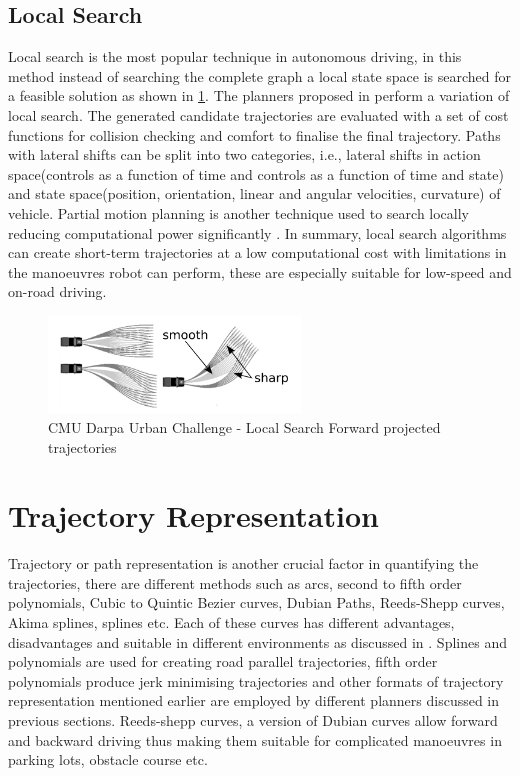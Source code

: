 \subsection{Local Search}
\label{rw_local_search}

Local search is the most popular technique in autonomous driving, in this method instead of searching the complete graph a local state space is searched for a feasible solution as shown in \ref{cmubossduc}. The planners proposed in \cite{darpa_urban_challenge} \cite{juniorstanford} \cite{kolski_thesis} \cite{Broggi2012} \cite{real_time_traj_plan_article} \cite{urbansafetyeth} perform a variation of local search. The generated candidate trajectories are evaluated with a set of cost functions for collision checking and comfort to finalise the final trajectory. Paths with lateral shifts can be split into two categories, i.e., lateral shifts in action space(controls as a function of time and controls as a function of time and state) and state space(position, orientation, linear and angular velocities, curvature) of vehicle\cite{howard_phd}. Partial motion planning is another technique used to search locally reducing computational power significantly \cite{partialmotionplanning}. In summary, local search algorithms can create short-term trajectories at a low computational cost with limitations in the manoeuvres robot can perform, these are especially suitable for low-speed and on-road driving.

\begin{figure}
	\centering
	\includegraphics[width=0.6\textwidth]{Images/related_work/trajectorysetbossduc.png}
	\caption{CMU Darpa Urban Challenge - Local Search Forward projected trajectories}
	\label{cmubossduc}
\end{figure} 

\section{Trajectory Representation}
\label{trajrep}
Trajectory or path representation is another crucial factor in quantifying the trajectories, there are different methods such as arcs, second to fifth order polynomials, Cubic to Quintic Bezier curves, Dubian Paths, Reeds-Shepp curves, Akima splines, splines etc. Each of these curves has different advantages, disadvantages and suitable in different environments as discussed in \cite{motion_planning_techniques}. Splines and polynomials are used for creating road parallel trajectories, fifth order polynomials produce jerk minimising trajectories\cite{werling_frenet} and other formats of trajectory representation mentioned earlier are employed by different planners discussed in previous sections. Reeds-shepp curves, a version of Dubian curves allow forward and backward driving \cite{reedsshepp} thus making them suitable for complicated manoeuvres in parking lots, obstacle course etc.


